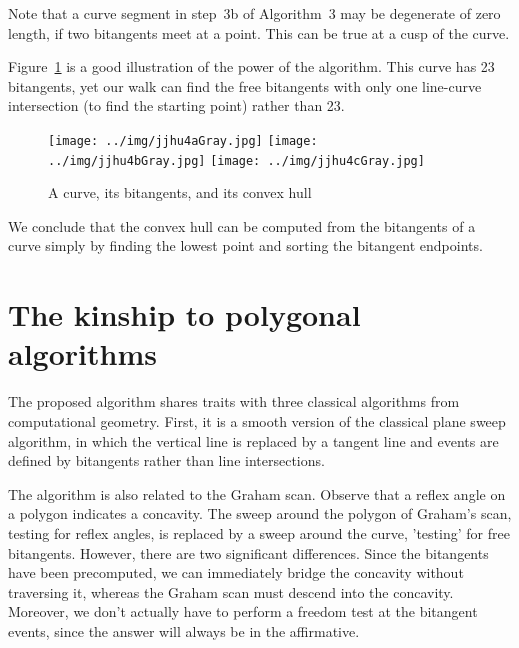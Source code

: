 \documentclass{sig-alternate}
\begin{document}
Note that a curve segment in step~3b of Algorithm~3 may be degenerate of zero length,
if two bitangents meet at a point.
This can be true at a cusp of the curve.

Figure~\ref{fig:convhullob3a} is a good illustration of the power of the 
algorithm.
This curve has 23 bitangents, yet our walk can find the free bitangents
with only one line-curve intersection (to find the starting point)
rather than 23.

\begin{figure}
\begin{center}
\texttt{[image: ../img/jjhu4aGray.jpg]}  
\texttt{[image: ../img/jjhu4bGray.jpg]}
\texttt{[image: ../img/jjhu4cGray.jpg]}
\end{center}
\caption{A curve, its bitangents, and its convex hull}
\label{fig:convhullob3a}
\end{figure}

We conclude that the convex hull can be computed from the bitangents of a curve
simply by finding the lowest point and sorting the bitangent endpoints.


\section{The kinship to polygonal algorithms}
\label{sec:analysis}

The proposed algorithm shares traits with three classical algorithms from computational geometry.
First, it is a smooth version of the classical plane sweep algorithm, 
in which the vertical line is replaced by a tangent line
and events are defined by bitangents rather than line intersections.



The algorithm is also related to the Graham scan.
Observe that a reflex angle on a polygon indicates a concavity.
The sweep around the polygon of Graham's scan, testing for reflex angles, is 
replaced by a sweep around the curve, 'testing' for free bitangents.
However, there are two significant differences.
Since the bitangents have been precomputed, we can immediately 
bridge the concavity without traversing it,
whereas the Graham scan must descend into the concavity.
Moreover, we don't actually have to perform a freedom test at the bitangent events, 
since the answer will always be in the affirmative.
\end{document}
